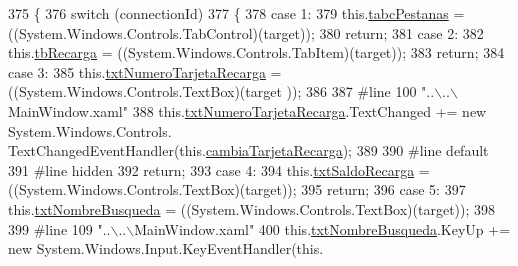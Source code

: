 \begin{DoxyCode}
375                                                                                                 \{
376             \textcolor{keywordflow}{switch} (connectionId)
377             \{
378             \textcolor{keywordflow}{case} 1:
379             this.\hyperlink{class_proyecto___integrador__3_1_1_main_window_a46bffd3bc6bf702252e6568b9c00f35c}{tabcPestanas} = ((System.Windows.Controls.TabControl)(target));
380             \textcolor{keywordflow}{return};
381             \textcolor{keywordflow}{case} 2:
382             this.\hyperlink{class_proyecto___integrador__3_1_1_main_window_af0f488983962bf0457a4b9d02c1df2a6}{tbRecarga} = ((System.Windows.Controls.TabItem)(target));
383             \textcolor{keywordflow}{return};
384             \textcolor{keywordflow}{case} 3:
385             this.\hyperlink{class_proyecto___integrador__3_1_1_main_window_a921e64f5a9f1531f12802b32f06bf71b}{txtNumeroTarjetaRecarga} = ((System.Windows.Controls.TextBox)(target
      ));
386             
387 \textcolor{preprocessor}{            #line 100 "..\(\backslash\)..\(\backslash\)MainWindow.xaml"}
388 \textcolor{preprocessor}{}            this.\hyperlink{class_proyecto___integrador__3_1_1_main_window_a921e64f5a9f1531f12802b32f06bf71b}{txtNumeroTarjetaRecarga}.TextChanged += \textcolor{keyword}{new} System.Windows.Controls.
      TextChangedEventHandler(this.\hyperlink{class_proyecto___integrador__3_1_1_main_window_ae62fbb5bc9da0f805d207465ef0ac41a}{cambiaTarjetaRecarga});
389             
390 \textcolor{preprocessor}{            #line default}
391 \textcolor{preprocessor}{}\textcolor{preprocessor}{            #line hidden}
392 \textcolor{preprocessor}{}            \textcolor{keywordflow}{return};
393             \textcolor{keywordflow}{case} 4:
394             this.\hyperlink{class_proyecto___integrador__3_1_1_main_window_aeb68364159bb1ed1dbf417a205fd3519}{txtSaldoRecarga} = ((System.Windows.Controls.TextBox)(target));
395             \textcolor{keywordflow}{return};
396             \textcolor{keywordflow}{case} 5:
397             this.\hyperlink{class_proyecto___integrador__3_1_1_main_window_a8b7a97d30e0788fb2ff72eaee1d0ab88}{txtNombreBusqueda} = ((System.Windows.Controls.TextBox)(target));
398             
399 \textcolor{preprocessor}{            #line 109 "..\(\backslash\)..\(\backslash\)MainWindow.xaml"}
400 \textcolor{preprocessor}{}            this.\hyperlink{class_proyecto___integrador__3_1_1_main_window_a8b7a97d30e0788fb2ff72eaee1d0ab88}{txtNombreBusqueda}.KeyUp += \textcolor{keyword}{new} System.Windows.Input.KeyEventHandler(this.

\end{DoxyCode}
